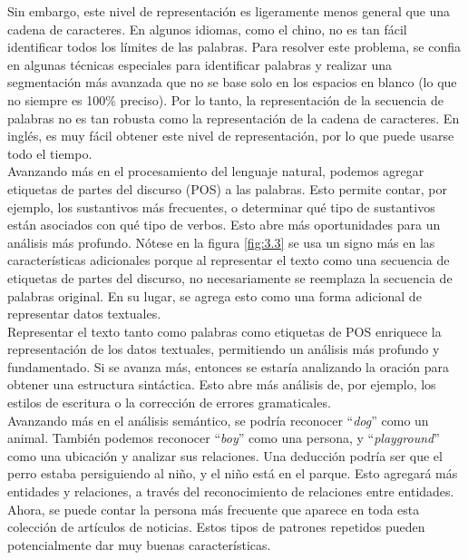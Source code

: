 Sin embargo, este nivel de representación es ligeramente menos general que una cadena de caracteres. En algunos idiomas, como el chino, no es tan fácil identificar todos los límites de las palabras. Para resolver este problema, se confia en algunas técnicas especiales para identificar palabras y realizar una segmentación más avanzada que no se base solo en los espacios en blanco (lo que no siempre es 100\% preciso). Por lo tanto, la representación de la secuencia de palabras no es tan robusta como la representación de la cadena de caracteres. En inglés, es muy fácil obtener este nivel de representación, por lo que puede usarse todo el tiempo. \\

Avanzando más en el procesamiento del lenguaje natural, podemos agregar etiquetas de partes del discurso (POS) a las palabras. Esto permite contar, por ejemplo, los sustantivos más frecuentes, o determinar qué tipo de sustantivos están asociados con qué tipo de verbos. Esto abre más oportunidades para un análisis más profundo. Nótese en la figura \ref{fig:3.3} se usa un signo más en las características adicionales porque al representar el texto como una secuencia de etiquetas de partes del discurso, no necesariamente se reemplaza la secuencia de palabras original. En su lugar, se agrega esto como una forma adicional de representar datos textuales. \\

Representar el texto tanto como palabras como etiquetas de POS enriquece la representación de los datos textuales, permitiendo un análisis más profundo y fundamentado. Si se avanza más, entonces se estaría analizando la oración para obtener una estructura sintáctica. Esto abre más análisis de, por ejemplo, los estilos de escritura o la corrección de errores gramaticales. \\

Avanzando más en el análisis semántico, se podría reconocer ``\textit{dog}'' como un animal. También podemos reconocer ``\textit{boy}'' como una persona, y ``\textit{playground}'' como una ubicación y analizar sus relaciones. Una deducción podría ser que el perro estaba persiguiendo al niño, y el niño está en el parque. Esto agregará más entidades y relaciones, a través del reconocimiento de relaciones entre entidades. Ahora, se puede contar la persona más frecuente que aparece en toda esta colección de artículos de noticias. Estos tipos de patrones repetidos pueden potencialmente dar muy buenas características. \\

